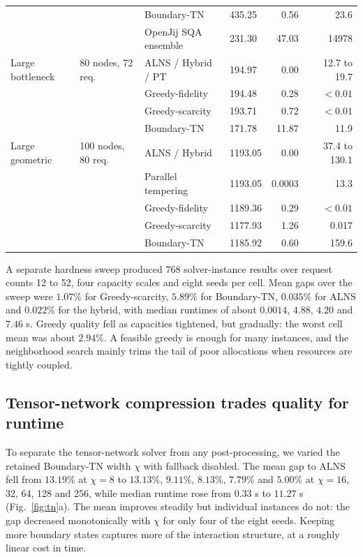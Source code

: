 \documentclass[pdflatex,sn-nature]{sn-jnl}
\theoremstyle{plain}
\theoremstyle{remark}
\begin{document}
\begin{table}[t]
{\begin{tabular}{@{}llllrr@{}}
& & Boundary-TN & 435.25 & 0.56 & 23.6\\
& & OpenJij SQA ensemble & 231.30 & 47.03 & 14978\\
\addlinespace
Large bottleneck & 80 nodes, 72 req. & ALNS / Hybrid / PT & 194.97 & 0.00 & 12.7 to 19.7\\
& & Greedy-fidelity & 194.48 & 0.28 & $<0.01$\\
& & Greedy-scarcity & 193.71 & 0.72 & $<0.01$\\
& & Boundary-TN & 171.78 & 11.87 & 11.9\\
\addlinespace
Large geometric & 100 nodes, 80 req. & ALNS / Hybrid & 1193.05 & 0.00 & 37.4 to 130.1\\
& & Parallel tempering & 1193.05 & 0.0003 & 13.3\\
& & Greedy-fidelity & 1189.36 & 0.29 & $<0.01$\\
& & Greedy-scarcity & 1177.93 & 1.26 & 0.017\\
& & Boundary-TN & 1185.92 & 0.60 & 159.6\\
\bottomrule
\end{tabular}%
}
\end{table}

A separate hardness sweep produced 768 solver-instance results over request counts 12 to 52, four capacity scales and eight seeds per cell. Mean gaps over the sweep were $1.07\%$ for Greedy-scarcity, $5.89\%$ for Boundary-TN, $0.035\%$ for ALNS and $0.022\%$ for the hybrid, with median runtimes of about $0.0014$, $4.88$, $4.20$ and $7.46$ s. Greedy quality fell as capacities tightened, but gradually: the worst cell mean was about $2.94\%$. A feasible greedy is enough for many instances, and the neighborhood search mainly trims the tail of poor allocations when resources are tightly coupled.

\subsection{Tensor-network compression trades quality for runtime}

To separate the tensor-network solver from any post-processing, we varied the retained Boundary-TN width $\chi$ with fallback disabled. The mean gap to ALNS fell from $13.19\%$ at $\chi=8$ to $13.13\%$, $9.11\%$, $8.13\%$, $7.79\%$ and $5.00\%$ at $\chi=16$, 32, 64, 128 and 256, while median runtime rose from $0.33$ s to $11.27$ s (Fig.~\ref{fig:tn}a). The mean improves steadily but individual instances do not: the gap decreased monotonically with $\chi$ for only four of the eight seeds. Keeping more boundary states captures more of the interaction structure, at a roughly linear cost in time.
\end{document}
